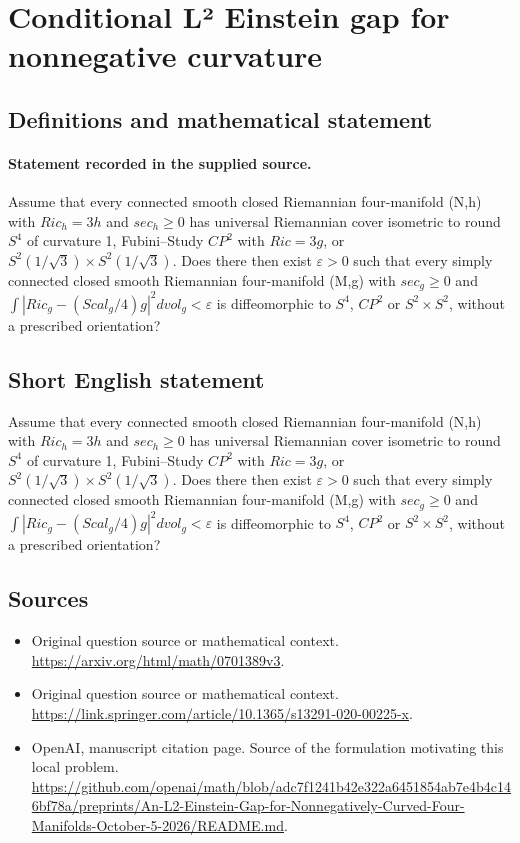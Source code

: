 \documentclass[11pt]{article}
\begin{document}
\section*{Conditional L² Einstein gap for nonnegative curvature}\label{statement}
\subsection{Definitions and mathematical statement}
\paragraph{Statement recorded in the supplied source.}
Assume that every connected smooth closed Riemannian four-manifold (N,h) with $Ric_h=3h$ and $sec_h\geq 0$ has universal Riemannian cover isometric to round $S^{4}$ of curvature 1, Fubini–Study $CP^{2}$ with $Ric=3g$, or $S^{2}(1/\surd 3)×S^{2}(1/\surd 3)$. Does there then exist $\varepsilon >0$ such that every simply connected closed smooth Riemannian four-manifold (M,g) with $sec_g\geq 0$ and $\int |Ric_g-(Scal_g/4)g|^{2}dvol_g<\varepsilon $ is diffeomorphic to $S^{4}$, $CP^{2}$ or $S^{2}×S^{2}$, without a prescribed orientation?
\subsection{Short English statement}
Assume that every connected smooth closed Riemannian four-manifold (N,h) with $Ric_h=3h$ and $sec_h\geq 0$ has universal Riemannian cover isometric to round $S^{4}$ of curvature 1, Fubini–Study $CP^{2}$ with $Ric=3g$, or $S^{2}(1/\surd 3)×S^{2}(1/\surd 3)$. Does there then exist $\varepsilon >0$ such that every simply connected closed smooth Riemannian four-manifold (M,g) with $sec_g\geq 0$ and $\int |Ric_g-(Scal_g/4)g|^{2}dvol_g<\varepsilon $ is diffeomorphic to $S^{4}$, $CP^{2}$ or $S^{2}×S^{2}$, without a prescribed orientation?
\subsection{Sources}
\begin{itemize}
\item[S1] Original question source or mathematical context.
\url{https://arxiv.org/html/math/0701389v3}.
\item[S2] Original question source or mathematical context.
\url{https://link.springer.com/article/10.1365/s13291-020-00225-x}.
\item[S3] OpenAI, manuscript citation page. Source of the formulation motivating this local problem.
\url{https://github.com/openai/math/blob/adc7f1241b42e322a6451854ab7e4b4c146bf78a/preprints/An-L2-Einstein-Gap-for-Nonnegatively-Curved-Four-Manifolds-October-5-2026/README.md}.
\end{itemize}
\end{document}
